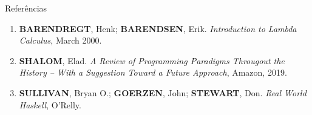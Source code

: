 \begin{frame}[fragile]{Referências}

    \begin{enumerate}
        \item \textbf{BARENDREGT}, Henk; \textbf{BARENDSEN}, Erik. \textit{Introduction to 
            Lambda Calculus}, March 2000.

        \item \textbf{SHALOM}, Elad. \textit{A Review of Programming Paradigms Througout the 
            History -- With a Suggestion Toward a Future Approach}, Amazon, 2019.

        \item \textbf{SULLIVAN}, Bryan O.; \textbf{GOERZEN}, John; \textbf{STEWART}, Don. 
            \textit{Real World Haskell}, O'Relly.
    \end{enumerate}

\end{frame}
